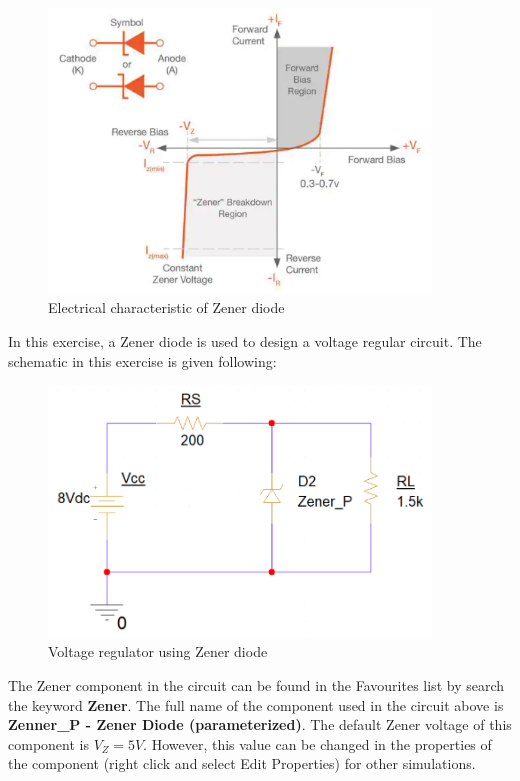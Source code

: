 \begin{figure}[!htp]
    \centering
    \includegraphics[width = 4in]{source/picture/bai_2/zener_3.PNG}
    \caption{Electrical characteristic of Zener diode}
    \label{lab02_zener1}
\end{figure}

In this exercise, a Zener diode is used to design a voltage regular circuit. The schematic in this exercise is given following:

\begin{figure}[!htp]
    \centering
    \includegraphics[width = 4in]{source/picture/bai_2/zener_1.PNG}
    \caption{Voltage regulator using Zener diode}
    \label{lab02_zener2}
\end{figure}

The Zener component in the circuit can be found in the Favourites list by search the keyword \textbf{Zener}. The full name of the component used in the circuit above is \textbf{Zenner\_P - Zener Diode (parameterized)}. The default Zener voltage of this component is $V_Z = 5V$. However, this value can be changed in the properties of the component (right click and select Edit Properties) for other simulations. \\

